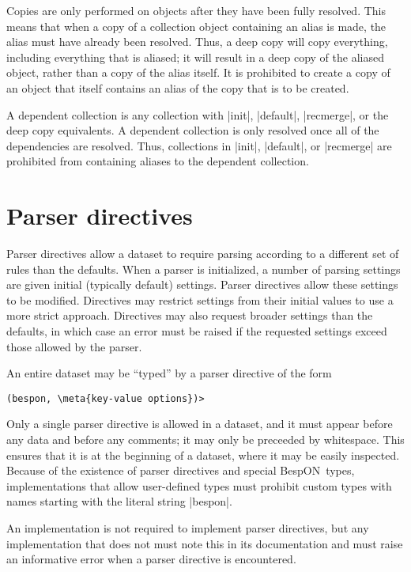 \documentclass[11pt]{article}
\newcommand{\bespon}{BespON}
\newcommand{\meta}[1]{\ensuremath{\langle}\textit{#1}\ensuremath{\rangle}}
\begin{document}
{{Copies are only performed on objects after they have been fully resolved.  This means that when a copy of a collection object containing an alias is made, the alias must have already been resolved.  Thus, a deep copy will copy everything, including everything that is aliased; it will result in a deep copy of the aliased object, rather than a copy of the alias itself.  It is prohibited to create a copy of an object that itself contains an alias of the copy that is to be created.

A dependent collection is any collection with |init|, |default|, |recmerge|, or the deep copy equivalents.  A dependent collection is only resolved once all of the dependencies are resolved.  Thus, collections in |init|, |default|, or |recmerge| are prohibited from containing aliases to the dependent collection.




\section{Parser directives}
\label{sec:parser-directive}

Parser directives allow a dataset to require parsing according to a different set of rules than the defaults.  When a parser is initialized, a number of parsing settings are given initial (typically default) settings.  Parser directives allow these settings to be modified.  Directives may restrict settings from their initial values to use a more strict approach.  Directives may also request broader settings than the defaults, in which case an error must be raised if the requested settings exceed those allowed by the parser.

An entire dataset may be ``typed'' by a parser directive of the form
\begin{Verbatim}[commandchars=\\\{\}]
(bespon, \meta{key-value options})>
\end{Verbatim}
Only a single parser directive is allowed in a dataset, and it must appear before any data and before any comments; it may only be preceeded by whitespace.  This ensures that it is at the beginning of a dataset, where it may be easily inspected.  Because of the existence of parser directives and special \bespon\ types, implementations that allow user-defined types must prohibit custom types with names starting with the literal string |bespon|.

An implementation is not required to implement parser directives, but any implementation that does not must note this in its documentation and must raise an informative error when a parser directive is encountered.  

}}
\end{document}
